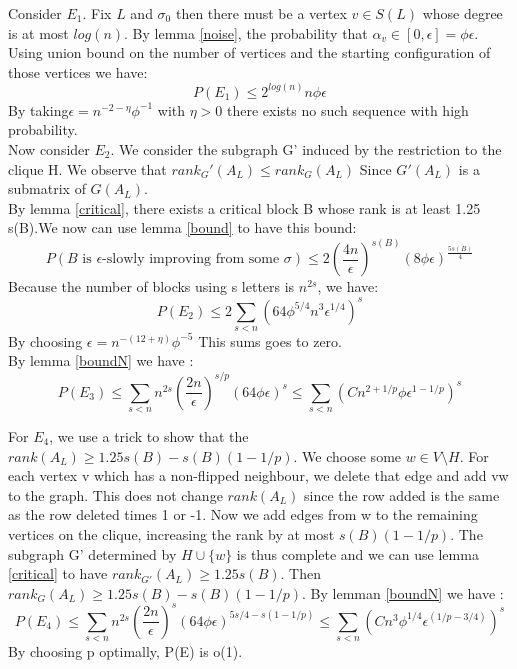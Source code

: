 Consider $E_1$. Fix $L$ and $\sigma_0$ then there must be a vertex $v \in S(L)$ whose degree is at most $log(n)$. By lemma  \ref{noise}, the probability that $\alpha_v \in [0, \epsilon] = \phi \epsilon$. Using union bound on the number of vertices and the starting configuration of those vertices we have:
\begin{equation}
P(E_1)  \leq 2^{log(n)}n \phi \epsilon
\end{equation}
By taking$\epsilon = n^{-2 - \eta} \phi^{-1}$ with $\eta > 0$ there exists no such sequence with high probability. \\

Now consider $E_2$. We consider the subgraph G' induced by the restriction to the clique H. We observe that $rank_G'(A_L) \leq rank_G(A_L)$ Since $G'(A_L)$ is a submatrix of $G(A_L)$.\\ 
By lemma \ref{critical}, there exists a critical block B whose rank is at least 1.25 s(B).We now can use lemma \ref{bound} to have this bound:
\begin{equation*}
P(B \text{ is }\epsilon \text {-slowly improving from some }\sigma) \leq 2(\frac{4n}{\epsilon})^{s(B)}(8\phi\epsilon)^{\frac{5s(B)}{4}}
\end{equation*}
Because the number of blocks using s letters is $n^{2s}$, we have:
\begin{equation*}
P(E_2) \leq 2 \sum_{s < n}(64\phi^{5/4}n^3\epsilon^{1/4})^s
\end{equation*}
By choosing $\epsilon = n^{-(12 + \eta)}\phi^{-5}$ This sums goes to zero.\\


By lemma \ref{boundN} we have :
\begin{equation*}
P(E_3) \leq  \sum_{s < n}n^{2s}(\dfrac{2n}{\epsilon})^{s/p}(64\phi\epsilon)^{s} \leq \sum_{s < n}(Cn^{2 + 1/p}\phi\epsilon^{1 - 1/p})^{s}
\end{equation*}

For $E_4$, we use a trick to show that the $rank(A_L) \geq 1.25s(B) - s(B)(1 - 1/p)$. We choose some $w \in V \setminus H$. For each vertex v which has a non-flipped neighbour, we delete that edge and add vw to the graph. This does not change $rank(A_L)$ since the row added is the same as the row deleted times 1 or -1. Now we add edges from w to the remaining vertices on the clique, increasing the rank by at most $s(B)(1 - 1/p)$. The subgraph G' determined by $H \cup \{w\}$ is thus complete and we can use  lemma \ref{critical} to have $rank_{G'}(A_L) \geq 1.25 s(B)$. Then $rank_G(A_L) \geq 1.25s(B) - s(B)(1 - 1/p)$.
By lemman \ref{boundN} we have :
\begin{equation*}
P(E_4) \leq  \sum_{s < n}n^{2s}(\dfrac{2n}{\epsilon})^{s}(64\phi\epsilon)^{5s/4 - s(1 - 1/p)} \leq \sum_{s < n}(Cn^{3}\phi^{1/4}\epsilon^{(1/p - 3/4)})^{s}
\end{equation*}
By choosing p optimally, P(E) is o(1). 